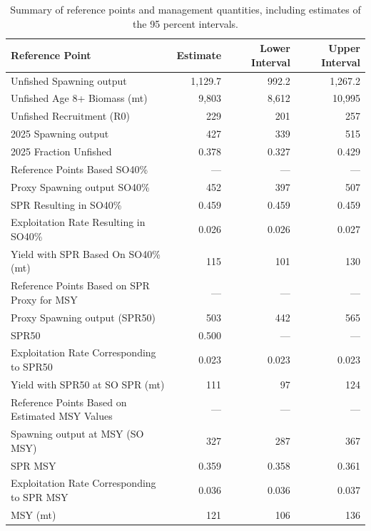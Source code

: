 \documentclass[
]{scrartcl}
\begin{document}
\begin{longtable}{lrrr}

\caption{\label{tbl-ref-points-es-2}Summary of reference points and
management quantities, including estimates of the 95 percent intervals.}

\tabularnewline

\toprule
Reference Point & Estimate & Lower Interval & Upper Interval \\ 
\midrule\addlinespace[2.5pt]
Unfished Spawning output & 1,129.7 & 992.2 & 1,267.2 \\ 
Unfished Age 8+ Biomass (mt) & 9,803 & 8,612 & 10,995 \\ 
Unfished Recruitment (R0) & 229 & 201 & 257 \\ 
2025 Spawning output & 427 & 339 & 515 \\ 
2025 Fraction Unfished & 0.378 & 0.327 & 0.429 \\ 
Reference Points Based SO40\% & — & — & — \\ 
Proxy Spawning output SO40\% & 452 & 397 & 507 \\ 
SPR Resulting in SO40\% & 0.459 & 0.459 & 0.459 \\ 
Exploitation Rate Resulting in SO40\% & 0.026 & 0.026 & 0.027 \\ 
Yield with SPR Based On SO40\% (mt) & 115 & 101 & 130 \\ 
Reference Points Based on SPR Proxy for MSY & — & — & — \\ 
Proxy Spawning output (SPR50) & 503 & 442 & 565 \\ 
SPR50 & 0.500 & — & — \\ 
Exploitation Rate Corresponding to SPR50 & 0.023 & 0.023 & 0.023 \\ 
Yield with SPR50 at SO SPR (mt) & 111 & 97 & 124 \\ 
Reference Points Based on Estimated MSY Values & — & — & — \\ 
Spawning output at MSY (SO MSY) & 327 & 287 & 367 \\ 
SPR MSY & 0.359 & 0.358 & 0.361 \\ 
Exploitation Rate Corresponding to SPR MSY & 0.036 & 0.036 & 0.037 \\ 
MSY (mt) & 121 & 106 & 136 \\ 
\bottomrule

\end{longtable}

\endgroup

\pagebreak
\end{document}
